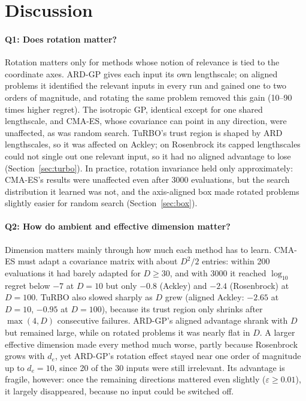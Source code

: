 \documentclass[12pt]{article}
\begin{document}
\section{Discussion}
\paragraph{Q1: Does rotation matter?} Rotation matters only for methods whose notion of relevance is
tied to the coordinate axes. ARD-GP gives each input its own lengthscale; on aligned problems it
identified the relevant inputs in every run and gained one to two orders of magnitude, and rotating
the same problem removed this gain (10--90 times higher regret). The isotropic GP, identical except
for one shared lengthscale, and CMA-ES, whose covariance can point in any direction, were unaffected,
as was random search. TuRBO's trust region is shaped by ARD lengthscales, so it was affected on
Ackley; on Rosenbrock its capped lengthscales could not single out one relevant input, so it had no
aligned advantage to lose (Section~\ref{sec:turbo}). In practice, rotation invariance held only
approximately: CMA-ES's results were unaffected even after 3000 evaluations, but the search
distribution it learned was not, and the axis-aligned box made rotated problems slightly easier for
random search (Section~\ref{sec:box}).

\paragraph{Q2: How do ambient and effective dimension matter?} Dimension matters mainly through how much
each method has to learn. CMA-ES must adapt a covariance matrix with about $D^2/2$ entries: within 200
evaluations it had barely adapted for $D\ge 30$, and with 3000 it reached $\log_{10}$ regret below $-7$
at $D=10$ but only $-0.8$ (Ackley) and $-2.4$ (Rosenbrock) at $D=100$. TuRBO also slowed sharply as $D$
grew (aligned Ackley: $-2.65$ at $D=10$, $-0.95$ at $D=100$), because its trust region only shrinks after
$\max(4,D)$ consecutive failures. ARD-GP's aligned advantage shrank with $D$ but remained large, while on
rotated problems it was nearly flat in $D$. A larger effective dimension made every method much worse,
partly because Rosenbrock grows with $d_e$, yet ARD-GP's rotation effect stayed near one order of
magnitude up to $d_e=10$, since 20 of the 30 inputs were still irrelevant. Its advantage is fragile,
however: once the remaining directions mattered even slightly ($\varepsilon\ge 0.01$), it largely
disappeared, because no input could be switched off.
\end{document}
